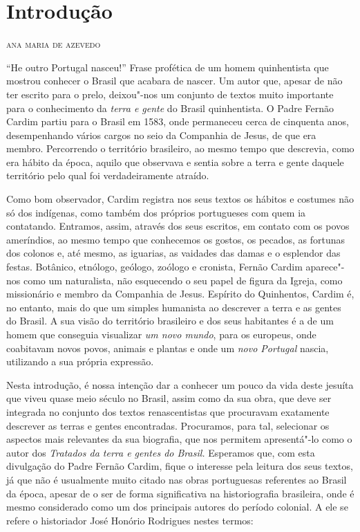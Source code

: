 \chapter[Introdução, \emph{por Ana Maria de Azevedo}]{Introdução}

\begin{flushright}
\textsc{ana maria de azevedo}
\end{flushright}

\noindent{}``He outro Portugal nasceu!'' Frase profética de um homem quinhentista que mostrou conhecer o
Brasil que acabara de nascer. Um autor que, apesar de não ter escrito
para o prelo, deixou"-nos um conjunto de textos muito importante para o
conhecimento da \textit{terra e gente} do Brasil quinhentista. O Padre
Fernão Cardim partiu para o Brasil em 1583, onde permaneceu cerca de
cinquenta anos, desempenhando vários cargos no seio da Companhia de
Jesus, de que era membro. Percorrendo o território brasileiro, ao mesmo
tempo que descrevia, como era hábito da época, aquilo que observava e
sentia sobre a terra e gente daquele território pelo qual foi
verdadeiramente atraído. 

Como bom observador, Cardim registra nos seus textos os hábitos e
costumes não só dos indígenas, como também dos próprios portugueses
com quem ia contatando. Entramos, assim, através dos seus escritos, em
contato com os povos ameríndios, ao mesmo tempo que conhecemos os
gostos, os pecados, as fortunas dos colonos e, até mesmo, as iguarias,
as vaidades das damas e o esplendor das festas. Botânico, etnólogo,
geólogo, zoólogo e cronista, Fernão Cardim aparece"-nos como um
naturalista, não esquecendo o seu papel de figura da Igreja, como
missionário e membro da Companhia de Jesus. Espírito do Quinhentos,
Cardim é, no entanto, mais do que um simples humanista ao descrever a
terra e as gentes do Brasil. A sua visão do território brasileiro e dos
seus habitantes é a de um homem que conseguia visualizar \textit{um
novo mundo}, para os europeus, onde coabitavam novos povos,
animais e plantas e onde um \textit{novo Portugal} nascia, utilizando a
sua própria expressão.

Nesta introdução, é nossa intenção dar a conhecer um pouco da vida
deste jesuíta que viveu quase meio século no Brasil, assim como da sua
obra, que deve ser integrada no conjunto dos textos renascentistas que
procuravam exatamente descrever as terras e gentes encontradas.
Procuramos, para tal, selecionar os aspectos mais relevantes da sua
biografia, que nos permitem apresentá"-lo como o autor dos
\textit{Tratados da terra e gentes do Brasil.} Esperamos que, com esta
divulgação do Padre Fernão Cardim, fique o interesse pela leitura dos
seus textos, já que não é usualmente muito citado nas obras portuguesas
referentes ao Brasil da época, apesar de o ser de forma significativa
na historiografia brasileira, onde é mesmo considerado como um dos
principais autores do período colonial. A ele se refere o historiador
José Honório Rodrigues nestes termos:

